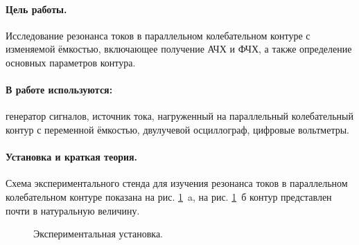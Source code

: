 \documentclass{physlab}
\begin{document}
	


\paragraph{Цель работы.} Исследование резонанса токов в параллельном колебательном контуре с изменяемой ёмкостью, включающее получение АЧХ и ФЧХ, а также определение основных параметров контура.

\paragraph{В работе используются:} генератор сигналов, источник тока, нагруженный на параллельный колебательный контур с переменной ёмкостью, двулучевой осциллограф, цифровые вольтметры.

\paragraph{Установка и краткая теория.} Схема экспериментального стенда для изучения резонанса токов в параллельном колебательном контуре показана на рис. \ref{ris:image1}~a, на рис. \ref{ris:image1}~б контур представлен почти в натуральную величину.
\begin{figure}[H]
	\begin{minipage}[H]{0.49\linewidth}
	\end{minipage}
	\hfill
	\begin{minipage}[h]{0.49\linewidth}
	\end{minipage}
	\caption{Экспериментальная установка.}
	\label{ris:image1}
\end{figure}
\end{document}
